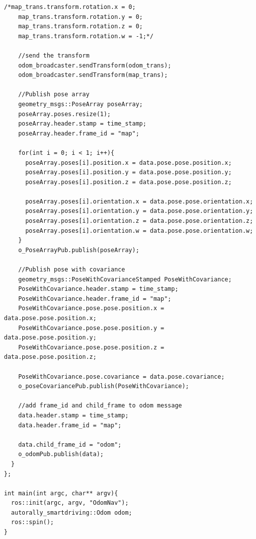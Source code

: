 \documentclass[compsoc,draftclsnofoot,onecolumn,10pt]{IEEEtran}
\begin{document}
\begin{lstlisting}[frame=single,caption={ROS odom/transform node (not including the .h file.
The .h file is located in our github repository)}]
    /*map_trans.transform.rotation.x = 0;
    map_trans.transform.rotation.y = 0;
    map_trans.transform.rotation.z = 0;
    map_trans.transform.rotation.w = -1;*/

    //send the transform
    odom_broadcaster.sendTransform(odom_trans);
    odom_broadcaster.sendTransform(map_trans);

    //Publish pose array
    geometry_msgs::PoseArray poseArray;
    poseArray.poses.resize(1);
    poseArray.header.stamp = time_stamp;
    poseArray.header.frame_id = "map";

    for(int i = 0; i < 1; i++){
      poseArray.poses[i].position.x = data.pose.pose.position.x;
      poseArray.poses[i].position.y = data.pose.pose.position.y;
      poseArray.poses[i].position.z = data.pose.pose.position.z;

      poseArray.poses[i].orientation.x = data.pose.pose.orientation.x;
      poseArray.poses[i].orientation.y = data.pose.pose.orientation.y;
      poseArray.poses[i].orientation.z = data.pose.pose.orientation.z;
      poseArray.poses[i].orientation.w = data.pose.pose.orientation.w;
    }
    o_PoseArrayPub.publish(poseArray);

    //Publish pose with covariance
    geometry_msgs::PoseWithCovarianceStamped PoseWithCovariance;
    PoseWithCovariance.header.stamp = time_stamp;
    PoseWithCovariance.header.frame_id = "map";
    PoseWithCovariance.pose.pose.position.x = data.pose.pose.position.x;
    PoseWithCovariance.pose.pose.position.y = data.pose.pose.position.y;
    PoseWithCovariance.pose.pose.position.z = data.pose.pose.position.z;

    PoseWithCovariance.pose.covariance = data.pose.covariance;
    o_poseCovariancePub.publish(PoseWithCovariance);

    //add frame_id and child_frame to odom message
    data.header.stamp = time_stamp;
    data.header.frame_id = "map";

    data.child_frame_id = "odom";
    o_odomPub.publish(data);
  }
};

int main(int argc, char** argv){
  ros::init(argc, argv, "OdomNav");
  autorally_smartdriving::Odom odom;
  ros::spin();
}
\end{lstlisting}
\end{document}
